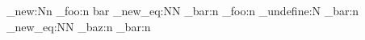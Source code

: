 \cs_new:Nn
  \module_foo:n
  { bar }
\cs_new_eq:NN
  \module_bar:n
  \module_foo:n
\cs_undefine:N
  \module_bar:n
\cs_new_eq:NN  %
  \module_baz:n
  \module_bar:n
